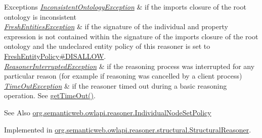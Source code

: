 \begin{DoxyExceptions}{Exceptions}
{\em \hyperlink{classorg_1_1semanticweb_1_1owlapi_1_1reasoner_1_1_inconsistent_ontology_exception}{Inconsistent\-Ontology\-Exception}} & if the imports closure of the root ontology is inconsistent \\
\hline
{\em \hyperlink{classorg_1_1semanticweb_1_1owlapi_1_1reasoner_1_1_fresh_entities_exception}{Fresh\-Entities\-Exception}} & if the signature of the individual and property expression is not contained within the signature of the imports closure of the root ontology and the undeclared entity policy of this reasoner is set to \hyperlink{enumorg_1_1semanticweb_1_1owlapi_1_1reasoner_1_1_fresh_entity_policy_a762eae6d5b2449d125311ecaabfdc8d0}{Fresh\-Entity\-Policy\#\-D\-I\-S\-A\-L\-L\-O\-W}. \\
\hline
{\em \hyperlink{classorg_1_1semanticweb_1_1owlapi_1_1reasoner_1_1_reasoner_interrupted_exception}{Reasoner\-Interrupted\-Exception}} & if the reasoning process was interrupted for any particular reason (for example if reasoning was cancelled by a client process) \\
\hline
{\em \hyperlink{classorg_1_1semanticweb_1_1owlapi_1_1reasoner_1_1_time_out_exception}{Time\-Out\-Exception}} & if the reasoner timed out during a basic reasoning operation. See \hyperlink{interfaceorg_1_1semanticweb_1_1owlapi_1_1reasoner_1_1_o_w_l_reasoner_a44b2c968f989afe5290db29c90faa164}{get\-Time\-Out()}. \\
\hline
\end{DoxyExceptions}
\begin{DoxySeeAlso}{See Also}
\hyperlink{enumorg_1_1semanticweb_1_1owlapi_1_1reasoner_1_1_individual_node_set_policy}{org.\-semanticweb.\-owlapi.\-reasoner.\-Individual\-Node\-Set\-Policy} 
\end{DoxySeeAlso}


Implemented in \hyperlink{classorg_1_1semanticweb_1_1owlapi_1_1reasoner_1_1structural_1_1_structural_reasoner_a0fcc28c79dc2b7588f4b1c744a6588be}{org.\-semanticweb.\-owlapi.\-reasoner.\-structural.\-Structural\-Reasoner}.

